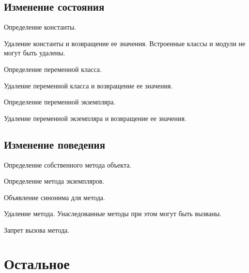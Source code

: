 \subsection{Изменение состояния}

\begin{methodlist}
  Определение константы.

  Удаление константы и возвращение ее значения. Встроенные классы и модули не могут быть удалены.

  Определение переменной класса.

  Удаление переменной класса и возвращение ее значения. 

  Определение переменной экземпляра.   

  Удаление переменной экземпляра и возвращение ее значения.
\end{methodlist}

\subsection{Изменение поведения}

\begin{methodlist}
  Определение собственного метода объекта. 

  Определение метода экземпляров.

  Объявление синонима для метода. 

  Удаление метода. Унаследованные методы при этом могут быть вызваны. 
 
  Запрет вызова метода.  
\end{methodlist}

\section{Остальное}

